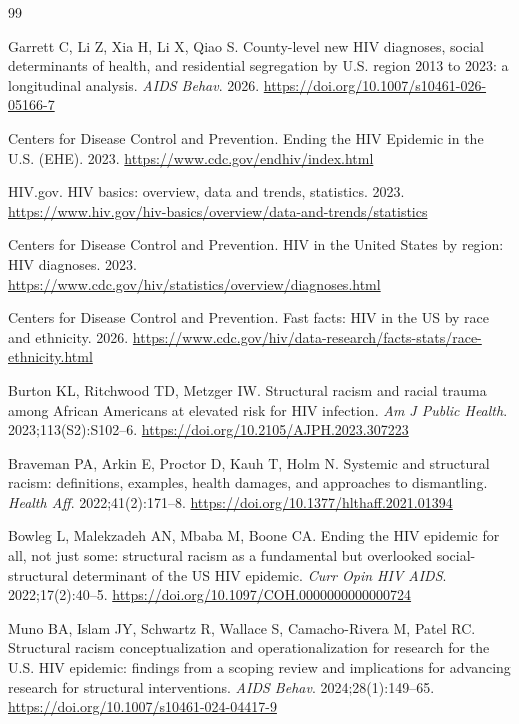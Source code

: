 \documentclass[11pt,letterpaper]{article}
\begin{document}
\begingroup
\small
\begin{thebibliography}{99}

 Garrett C, Li Z, Xia H, Li X, Qiao S. County-level new HIV diagnoses, social determinants of health, and residential segregation by U.S. region 2013 to 2023: a longitudinal analysis. \textit{AIDS Behav}. 2026. \url{https://doi.org/10.1007/s10461-026-05166-7}

 Centers for Disease Control and Prevention. Ending the HIV Epidemic in the U.S. (EHE). 2023. \url{https://www.cdc.gov/endhiv/index.html}

 HIV.gov. HIV basics: overview, data and trends, statistics. 2023. \url{https://www.hiv.gov/hiv-basics/overview/data-and-trends/statistics}

 Centers for Disease Control and Prevention. HIV in the United States by region: HIV diagnoses. 2023. \url{https://www.cdc.gov/hiv/statistics/overview/diagnoses.html}

 Centers for Disease Control and Prevention. Fast facts: HIV in the US by race and ethnicity. 2026. \url{https://www.cdc.gov/hiv/data-research/facts-stats/race-ethnicity.html}

 Burton KL, Ritchwood TD, Metzger IW. Structural racism and racial trauma among African Americans at elevated risk for HIV infection. \textit{Am J Public Health}. 2023;113(S2):S102--6. \url{https://doi.org/10.2105/AJPH.2023.307223}

 Braveman PA, Arkin E, Proctor D, Kauh T, Holm N. Systemic and structural racism: definitions, examples, health damages, and approaches to dismantling. \textit{Health Aff}. 2022;41(2):171--8. \url{https://doi.org/10.1377/hlthaff.2021.01394}

 Bowleg L, Malekzadeh AN, Mbaba M, Boone CA. Ending the HIV epidemic for all, not just some: structural racism as a fundamental but overlooked social-structural determinant of the US HIV epidemic. \textit{Curr Opin HIV AIDS}. 2022;17(2):40--5. \url{https://doi.org/10.1097/COH.0000000000000724}

 Muno BA, Islam JY, Schwartz R, Wallace S, Camacho-Rivera M, Patel RC. Structural racism conceptualization and operationalization for research for the U.S. HIV epidemic: findings from a scoping review and implications for advancing research for structural interventions. \textit{AIDS Behav}. 2024;28(1):149--65. \url{https://doi.org/10.1007/s10461-024-04417-9}


\end{thebibliography}
\end{document}
